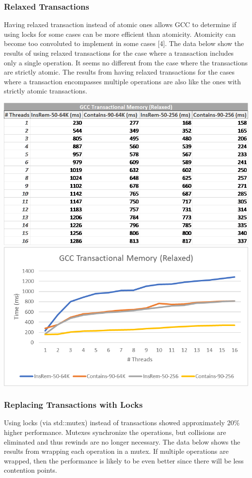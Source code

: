 \documentclass[11pt]{article} %
\begin{document}
\subsubsection{Relaxed Transactions}

Having relaxed transaction instead of atomic ones allows GCC to determine if using locks for some cases can be more efficient than atomicity. Atomicity can become too convoluted to implement in some cases [4]. The data below show the results of using relaxed transactions for the case where a transaction includes only a single operation. It seems no different from the case where the transactions are strictly atomic. The results from having relaxed transactions for the cases where a transaction encompasses multiple operations are also like the ones with strictly atomic transactions.

\bigskip
\includegraphics[width=0.5\linewidth]{Table4.png}
\includegraphics[width=0.5\linewidth]{Graph4.png}

\subsubsection{Replacing Transactions with Locks}

Using locks (via std::mutex) instead of transactions showed approximately 20\% higher performance. Mutexes synchronize the operations, but collisions are eliminated and thus rewinds are no longer necessary. The data below shows the results from wrapping each operation in a mutex. If multiple operations are wrapped, then the performance is likely to be even better since there will be less contention points.
\end{document}
